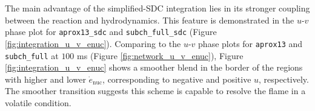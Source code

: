 \documentclass[preprint,times,tighten,linenumbers,trackchanges]{aastex631}
\begin{document}
\begin{figure*}
\centering
{}
\caption{\label{fig:integration_u_v_enuc} $u-v$ phase plots for {\tt aprox13\_sdc} (left panel) and {\tt subch\_full\_sdc} (right panel) at $t = 100$ms.}
\end{figure*}


The main advantage of the simplified-SDC integration lies in its stronger coupling between the reaction and hydrodynamics. This feature is demonstrated in the $u$-$v$ phase plot for {\tt aprox13\_sdc} and {\tt subch\_full\_sdc} (Figure \ref{fig:integration_u_v_enuc}). Comparing to the $u$-$v$ phase plots for {\tt aprox13} and {\tt subch\_full} at $100$ ms (Figure \ref{fig:network_u_v_enuc}), Figure \ref{fig:integration_u_v_enuc} shows a smoother blend in the border of the regions with higher and lower $\dot{e}_{\textrm{nuc}}$, corresponding to negative and positive $u$, respectively. The smoother transition suggests this scheme is capable to resolve the flame in a volatile condition. 


\begin{comment}
\begin{figure*}
\centering
\plotone{integration_time_profile.pdf}
\caption{\label{fig:integration_profile} Time profiles showing weighted temperature and energy generation rate of the burning front for {\tt aprox13}, {\tt aprox13\_sdc}, {\tt subch\_full}, and {\tt subch\_full\_sdc}.}
\end{figure*}

\begin{figure*}
\centering
\plotone{integration_front.pdf}
\caption{\label{fig:integration_front} Flame front position as a function of time for {\tt aprox13}, {\tt aprox13\_sdc}, {\tt subch\_full}, and {\tt subch\_full\_sdc}. The dashed lines are the fitted curves using Eq. \ref{Eq:quadratic_fit} and Eq.\ref{Eq:tanh_fit}.}
\end{figure*}
\end{comment}
\end{document}

